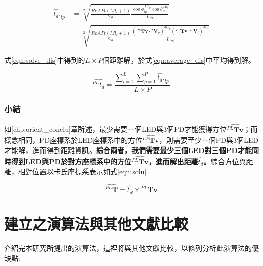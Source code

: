         \begin{equation}
            \label{eqn:solve_dis}
            \begin{aligned}
            \hat{t_d },_{lp} &= \sqrt[2]{\frac{ReAPt (Ml_{l}+1)}{2\pi}
                \frac{\cos\phi_{lp}^{Mp_{p}}\cos \theta_{lp}^{Ml_{l}} }
                {Ie_{lp}}
            }\\
            & = \sqrt[2]
            {
                \frac{ReAPt (Ml_{l}+1)}{2\pi}
                \frac{
                    (\hat{{^{PL}\boldsymbol{Tv}}}\cdot ^P\boldsymbol{V}_p)^{Mp_{p}}
                    (\hat{{^{LP}\boldsymbol{Tv}}}\cdot ^L\boldsymbol{V}_l)^{Ml_{l}} }
                {Ie_{lp}}
            }
            \end{aligned}
        \end{equation}


        式\ref{eqn:solve_dis}中得到的$L\times P$個距離解，於式\ref{eqn:average_dis}中平均得到解。

        \begin{equation}
            \label{eqn:average_dis}
            \hat{^{PL}t_d }= \frac{\sum^{L}_{l=1}\sum^{P}_{p=1} \hat{t_d },_{lp} }{L\times P}
        \end{equation}

        \subsubsection{小結}

        如\ref{chp:orient_conclu}章所述，最少需要一個LED與3個PD才能獲得方位$\hat{{^{PL}\boldsymbol{Tv}}}$；而概念相同，PD座標系於LED座標系中的方位$\hat{{^{LP}\boldsymbol{Tv}}}$，則需要至少一個PD與3個LED才能解，進而得到距離資訊。\textbf{綜合兩者，我們需要最少三個LED對三個PD才能同時得到LED與PD於對方座標系中的方位$\hat{{^{PL}\boldsymbol{Tv}}}$，進而解出距離$\hat{t_d}$。}綜合方位與距離，相對位置以卡氏座標系表示如式\ref{eqn:solu}


        \begin{equation}
            \label{eqn:solu}
            \hat{^{PL}\boldsymbol{T} }= \hat{t_d} \times {^{PL}\boldsymbol{Tv}} 
        \end{equation}

\section{建立之演算法與其他文獻比較}
\label{chp:algorithm_ad_dis}


介紹完本研究所提出的演算法，這裡將與其他文獻比較，以條列分析此演算法的優缺點:


